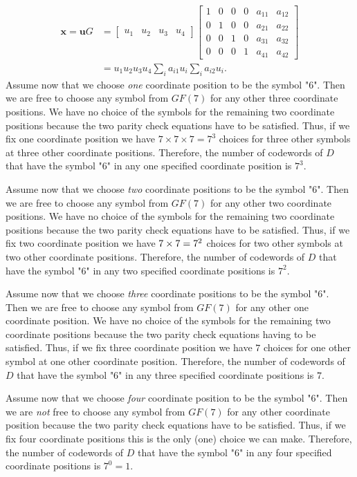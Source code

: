 \begin{align*}
\bm{x} = \bm{u}G &=
\begin{bmatrix}
  u_1 & u_2 & u_3 & u_4
\end{bmatrix}
\begin{bmatrix}
 1&   0&   0&   0&   a_{11}&   a_{12}\\
 0&   1&   0&   0&   a_{21}&   a_{22}\\
 0&   0&   1&   0&   a_{31}&   a_{32}\\
 0&   0&   0&   1&   a_{41}&   a_{42}
\end{bmatrix}\\
&=u_1 u_2 u_3 u_4 \sum_i a_{i1}u_i  \sum_i a_{i2}u_i.
\end{align*}
Assume now that we choose \textit{one} coordinate position to be the symbol "6". Then we are free to choose any symbol from $GF(7)$ for any other three coordinate positions.  We have no choice of the symbols for the remaining two coordinate positions because the two parity check equations have to be satisfied. Thus, if we fix one coordinate position we have $7\times7\times7=7^3$ choices for three other symbols at three other coordinate positions.  Therefore, the number of codewords of $D$ that have the symbol "6" in any one specified coordinate position is $7^3$.

Assume now that we choose \textit{two} coordinate positions to be the symbol "6". Then we are free to choose any symbol from $GF(7)$ for any other two coordinate positions.  We have no choice of the symbols for the remaining two coordinate positions because the two parity check equations have to be satisfied. Thus, if we fix two coordinate position we have $7\time7\times7=7^2$ choices for two other symbols at two other coordinate positions.  Therefore, the number of codewords of $D$ that have the symbol "6" in any two specified coordinate positions is $7^2$.

Assume now that we choose \textit{three} coordinate positions to be the symbol "6". Then we are free to choose any symbol from $GF(7)$ for any other one coordinate position.  We have no choice of the symbols for the remaining two coordinate positions because the two parity check equations having to be satisfied. Thus, if we fix three coordinate position we have $7$ choices for one other symbol at one other coordinate position.  Therefore, the number of codewords of $D$ that have the symbol "6" in any three specified coordinate positions is $7$.

Assume now that we choose \textit{four} coordinate position to be the symbol "6". Then we are \textit{not} free to choose any symbol from $GF(7)$ for any other coordinate position because the two parity check equations have to be satisfied. Thus, if we fix four coordinate positions this is the only (one) choice we can make.  Therefore, the number of codewords of $D$ that have the symbol "6" in any four specified coordinate positions is $7^0=1$.



